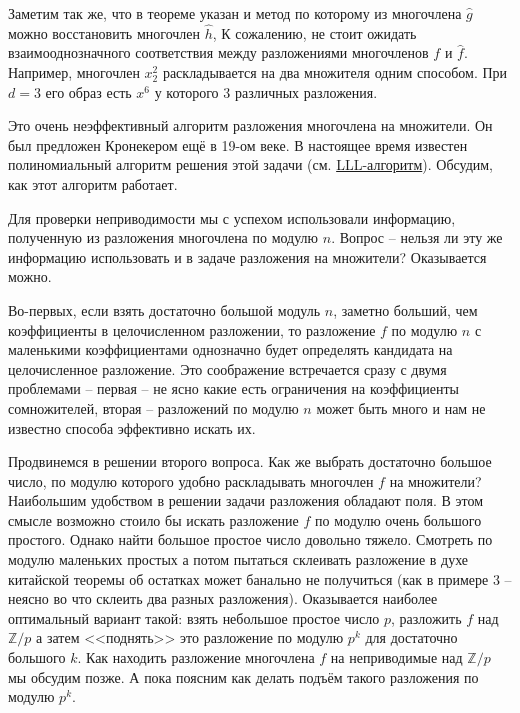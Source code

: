 \documentclass[12pt,a4paper,oneside]{book}
\theoremstyle{definition}
\newcommand{\Z}{\mathbb Z}
\begin{document}
Заметим так же, что в теореме указан и метод по которому из многочлена $\hat{g}$ можно восстановить многочлен $\hat h$,
К сожалению, не стоит ожидать взаимооднозначного соответствия между разложениями многочленов $f$ и $\hat{f}$. Например, многочлен $x_2^2$ раскладывается на два множителя одним способом. При $d=3$ его образ есть $x^6$ у которого 3 различных разложения.

Это очень неэффективный алгоритм разложения многочлена на множители. Он был предложен Кронекером ещё в 19-ом веке. В настоящее время известен полиномиальный алгоритм решения этой задачи (см. \href{http://www.math.leidenuniv.nl/%7Ehwl/PUBLICATIONS/1982f/art.pdf}{LLL-алгоритм}). Обсудим, как этот алгоритм работает.

Для проверки неприводимости мы с успехом использовали информацию, полученную из разложения многочлена по модулю $n$. Вопрос -- нельзя ли эту же информацию использовать и в задаче разложения на множители? Оказывается можно.

Во-первых, если взять достаточно большой модуль $n$, заметно больший, чем коэффициенты в целочисленном разложении, то разложение $f$ по модулю $n$ с маленькими коэффициентами однозначно будет определять кандидата на целочисленное разложение. Это соображение встречается сразу с двумя проблемами -- первая -- не ясно какие есть ограничения на коэффициенты сомножителей, вторая -- разложений по модулю $n$ может быть много и нам не известно способа эффективно искать их.



Продвинемся в решении второго вопроса. Как же  выбрать достаточно большое число, по модулю которого удобно раскладывать многочлен $f$ на множители? Наибольшим удобством в решении задачи разложения обладают поля. В этом смысле возможно стоило бы искать разложение $f$ по модулю очень большого простого. Однако найти большое простое число довольно тяжело. Смотреть по модулю маленьких простых а потом пытаться склеивать разложение в духе китайской теоремы об остатках может банально не получиться (как в примере 3 -- неясно во что склеить два разных разложения). Оказывается наиболее оптимальный вариант такой: взять небольшое простое число $p$, разложить $f$ над $\Z/p$ а затем <<поднять>> это разложение по модулю $p^k$ для достаточно большого $k$. Как находить разложение многочлена $f$ на неприводимые над $\Z/p$ мы обсудим позже. А пока поясним как делать подъём такого разложения по модулю $p^k$.
\end{document}
